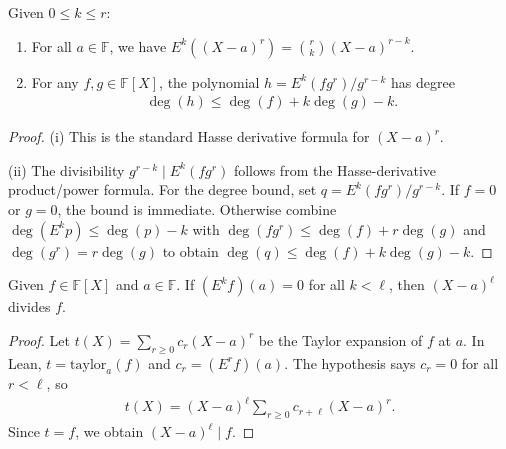 \begin{corollary}\label{cor:hasse-formulas} \leanok {}
  Given $0 \leq k \leq r$:
  \begin{enumerate}
    \item[(i)] For all $a \in \mathbb{F}$, we have $E^k((X-a)^r) = \binom{r}{k}(X-a)^{r-k}$.
    \item[(ii)] For any $f, g \in \mathbb{F}[X]$, the polynomial $h = E^k(fg^r)/g^{r-k}$ has degree
          \begin{align*}
            \deg(h) \leq \deg(f) + k\deg(g) - k.
          \end{align*}
  \end{enumerate}
\end{corollary}
\begin{proof} \leanok
  (i) This is the standard Hasse derivative formula for $(X-a)^r$.

  (ii) The divisibility $g^{r-k} \mid E^k(f g^r)$ follows from the Hasse-derivative
  product/power formula. For the degree bound, set $q = E^k(f g^r) / g^{r-k}$.
  If $f = 0$ or $g = 0$, the bound is immediate. Otherwise combine
  $\deg(E^k p) \leq \deg(p) - k$ with $\deg(f g^r) \leq \deg(f) + r\deg(g)$ and
  $\deg(g^r) = r\deg(g)$ to obtain $\deg(q) \leq \deg(f) + k\deg(g) - k$.
\end{proof}

\begin{lemma}\label{lem:hasse-divisibility} \leanok {}
  Given $f \in \mathbb{F}[X]$ and $a \in \mathbb{F}$. If $(E^k f)(a) = 0$ for all $k < \ell$, then $(X-a)^\ell$ divides $f$.
\end{lemma}
\begin{proof} \leanok
  Let $t(X) = \sum_{r \ge 0} c_r (X-a)^r$ be the Taylor expansion of $f$ at $a$.
  In Lean, $t = \mathrm{taylor}_a(f)$ and $c_r = (E^r f)(a)$.
  The hypothesis says $c_r = 0$ for all $r < \ell$, so
  \begin{align*}
    t(X) = (X-a)^\ell \sum_{r \ge 0} c_{r+\ell} (X-a)^r.
  \end{align*}
  Since $t=f$, we obtain $(X-a)^\ell \mid f$.
\end{proof}

